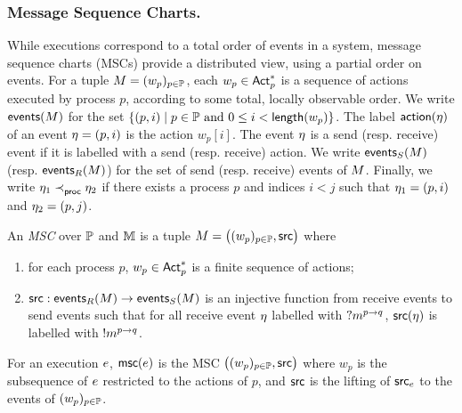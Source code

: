 \subsubsection*{Message Sequence Charts.}
While executions correspond to a total order of events in a system,  
message sequence charts (MSCs) provide a distributed view, using  
a partial order on events.  
For a tuple $M=(w_p)_{p\in\mathbb{P}}$, each $w_p \in \mathsf{Act}_{p}^*$ is a  
sequence of actions executed by process $p$, according to some  
total, locally observable order.  
We write $\mathsf{events}(M)$ for the set  
$\{(p,i) \mid p \in \mathbb{P} \text{ and } 0 \leq i < \mathsf{length}(w_p)\}$.  
The label $\mathsf{action}(\eta)$ of an event $\eta=(p,i)$ is the action  
$w_p[i]$. The event $\eta$ is a send (resp. receive) event if it is  
labelled with a send (resp. receive) action.  
We write $\mathsf{events}_S(M)$ (resp. $\mathsf{events}_R(M)$)  
for the set of send (resp. receive) events of $M$.
Finally, we write $\eta_1 \mathrel{\prec_{\mathsf{proc}}^{}} \eta_2$ if there  
exists a process $p$ and indices $i<j$ such that  
$\eta_1=(p,i)$ and $\eta_2=(p,j)$.  

\bigskip

\begin{definition}\label{def:msc}
	An \emph{MSC} over $\mathbb{P}$ and $\mathbb{M}$ is a tuple 
	$M = \big((w_p)_{p\in\mathbb{P}},\mathsf{src}\big)$ where
    \begin{enumerate}
        \item for each process $p$, $w_p\in\mathsf{Act}_{p}^*$ is a finite sequence 
			of actions;
		\item $\mathsf{src} : \mathsf{events}_R(M) \to \mathsf{events}_S(M)$ is 
			an injective function from receive events to send events such that
			for all receive event $\eta$ labelled with $?m^{p\to q}$,
			$\mathsf{src}(\eta)$ is labelled with $!m^{p\to q}$.
    \end{enumerate}
\end{definition}

For an execution $e$,  $\mathsf{msc}(e)$ is the MSC 
$\big((w_p)_{p\in\mathbb{P}},\mathsf{src}\big)$ where $w_p$ is the 
subsequence of $e$ restricted to the actions of $p$,
and $\mathsf{src}$ is the lifting of $\mathsf{src}_{e}$ to the
events of $(w_p)_{p\in\mathbb{P}}$.

\bigskip


